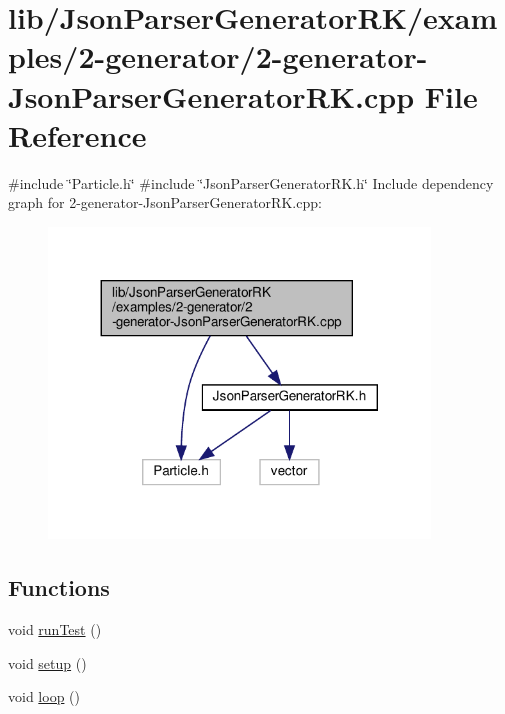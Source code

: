 \hypertarget{2-generator-_json_parser_generator_r_k_8cpp}{}\section{lib/\+Json\+Parser\+Generator\+R\+K/examples/2-\/generator/2-\/generator-\/\+Json\+Parser\+Generator\+RK.cpp File Reference}
\label{2-generator-_json_parser_generator_r_k_8cpp}
{\ttfamily \#include \char`\"{}Particle.\+h\char`\"{}}\newline
{\ttfamily \#include \char`\"{}Json\+Parser\+Generator\+R\+K.\+h\char`\"{}}\newline
Include dependency graph for 2-\/generator-\/\+Json\+Parser\+Generator\+RK.cpp\+:
\nopagebreak
\begin{figure}[H]
\begin{center}
\leavevmode
\includegraphics[width=287pt]{2-generator-_json_parser_generator_r_k_8cpp__incl}
\end{center}
\end{figure}
\subsection*{Functions}
\begin{DoxyCompactItemize}
\item 
void \hyperlink{2-generator-_json_parser_generator_r_k_8cpp_a822f652c6fc2f163c182a6e5fe922c23}{run\+Test} ()
\item 
void \hyperlink{2-generator-_json_parser_generator_r_k_8cpp_a4fc01d736fe50cf5b977f755b675f11d}{setup} ()
\item 
void \hyperlink{2-generator-_json_parser_generator_r_k_8cpp_afe461d27b9c48d5921c00d521181f12f}{loop} ()
\end{DoxyCompactItemize}
